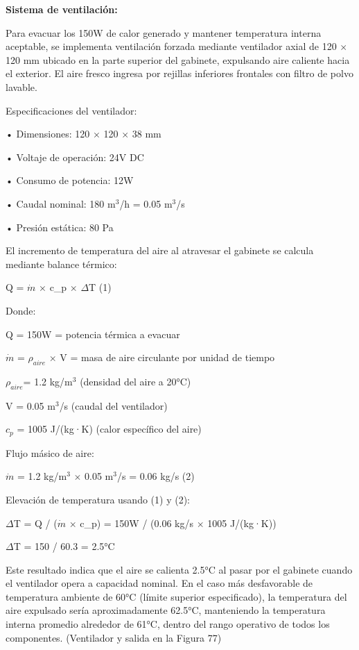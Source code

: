 \documentclass[12pt,a4paper,oneside]{report}
\begin{document}
\textbf{Sistema de ventilación:}

Para evacuar los 150W de calor generado y mantener temperatura interna aceptable, se implementa ventilación forzada mediante ventilador axial de 120 \ensuremath{\times} 120 mm ubicado en la parte superior del gabinete, expulsando aire caliente hacia el exterior. El aire fresco ingresa por rejillas inferiores frontales con filtro de polvo lavable.

Especificaciones del ventilador:

• Dimensiones: 120 \ensuremath{\times} 120 \ensuremath{\times} 38 mm

• Voltaje de operación: 24V DC

• Consumo de potencia: 12W

• Caudal nominal: 180 m\ensuremath{^{3}}/h = 0.05 m\ensuremath{^{3}}/s

• Presión estática: 80 Pa

El incremento de temperatura del aire al atravesar el gabinete se calcula mediante balance térmico:

Q = \ensuremath{\dot{m}} \ensuremath{\times} c\_p \ensuremath{\times} \ensuremath{\Delta}T (1)

Donde:

Q = 150W = potencia térmica a evacuar

\ensuremath{\dot{m}} = \(\rho_{aire}\) \ensuremath{\times} V = masa de aire circulante por unidad de tiempo

\(\rho_{aire}\)= 1.2 kg/m\ensuremath{^{3}} (densidad del aire a 20°C)

V = 0.05 m\ensuremath{^{3}}/s (caudal del ventilador)

\(c_{p}\) = 1005 J/(kg·K) (calor específico del aire)

Flujo másico de aire:

\ensuremath{\dot{m}} = 1.2 kg/m\ensuremath{^{3}} \ensuremath{\times} 0.05 m\ensuremath{^{3}}/s = 0.06 kg/s (2)

Elevación de temperatura usando (1) y (2):

\ensuremath{\Delta}T = Q / (\ensuremath{\dot{m}} \ensuremath{\times} c\_p) = 150W / (0.06 kg/s \ensuremath{\times} 1005 J/(kg·K))

\ensuremath{\Delta}T = 150 / 60.3 = 2.5°C

Este resultado indica que el aire se calienta 2.5°C al pasar por el gabinete cuando el ventilador opera a capacidad nominal. En el caso más desfavorable de temperatura ambiente de 60°C (límite superior especificado), la temperatura del aire expulsado sería aproximadamente 62.5°C, manteniendo la temperatura interna promedio alrededor de 61°C, dentro del rango operativo de todos los componentes. (Ventilador y salida en la Figura 77)
\end{document}
